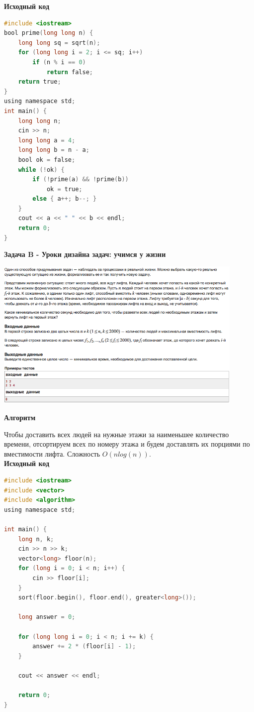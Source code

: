 \documentclass[a4paper,12pt]{article}
\begin{document}
\textbf{{\large Исходный код}} \\
\begin{lstlisting}[language=C]
#include <iostream>
bool prime(long long n) {
    long long sq = sqrt(n);
    for (long long i = 2; i <= sq; i++)
        if (n % i == 0)
            return false;
    return true;
}
using namespace std;
int main() {
    long long n;
    cin >> n;
    long long a = 4;
    long long b = n - a;
    bool ok = false;
    while (!ok) {
        if (!prime(a) && !prime(b))
            ok = true;
        else { a++; b--; }
    }
    cout << a << " " << b << endl;
    return 0;
}\end{lstlisting}

\newpage
\textbf{{\large Задача B - Уроки дизайна задач: учимся у жизни}}

\begin{center}
\includegraphics[width=0.9\textwidth]{C_270/C_270_B.png}\\ [1cm]
\end{center}

\textbf{{\large Алгоритм}}

Чтобы доставить всех людей на нужные этажи за наименьшее количество времени, отсортируем всех по номеру этажа и будем доставлять их порциями по вместимости лифта. Сложность $O(nlog(n))$.\\

\textbf{{\large Исходный код}} \\
\begin{lstlisting}[language=C]
#include <iostream>
#include <vector>
#include <algorithm>
using namespace std;

int main() {
    long n, k;
    cin >> n >> k;
    vector<long> floor(n);
    for (long i = 0; i < n; i++) {
        cin >> floor[i];
    }
    sort(floor.begin(), floor.end(), greater<long>());

    long answer = 0;

    for (long long i = 0; i < n; i += k) {
        answer += 2 * (floor[i] - 1);
    }

    cout << answer << endl;

    return 0;
}
\end{lstlisting}
\end{document}
